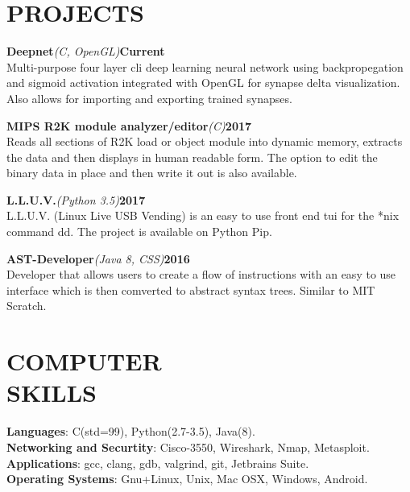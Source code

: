 \documentclass[line,margin]{res}
\begin{document}
\begin{resume}
\section{PROJECTS}
\par
    \textbf{Deepnet}{\sl(C, OpenGL)}\hfill \textbf{Current}\\ 
    Multi-purpose four layer cli deep learning neural network using 
    backpropegation and sigmoid activation integrated with OpenGL for synapse 
    delta visualization. Also allows for importing and exporting trained 
    synapses.
\par
    \textbf{MIPS R2K module analyzer/editor}{\sl(C)}\hfill \textbf{2017}\\
    Reads all sections of R2K load or object module into dynamic memory, 
    extracts the data and then displays in human readable form. The option to 
    edit the binary data in place and then write it out is also available.
\par
    \textbf{L.L.U.V.}{\sl(Python 3.5)}\hfill \textbf{2017}\\ 
    L.L.U.V. (Linux Live USB Vending) is an easy to use front end tui for the 
    *nix command dd. The project is available on Python Pip.
\par
    \textbf{AST-Developer}{\sl(Java 8, CSS)}\hfill \textbf{2016}\\ 
    Developer that allows users to create a flow of instructions with an easy to
    use interface which is then comverted to abstract syntax trees. Similar to 
    MIT Scratch.

\section{COMPUTER\\SKILLS}
\textbf{Languages}: C(std=99), Python(2.7-3.5), Java(8).
\\
\textbf{Networking and Securtity}: Cisco-3550, Wireshark, Nmap, Metasploit.  
\\
\textbf{Applications}: gcc, clang, gdb, valgrind, git, Jetbrains Suite. 
\\
\textbf{Operating Systems}: 
Gnu+Linux, Unix, Mac OSX, Windows, Android.


\end{resume}
\end{document}

